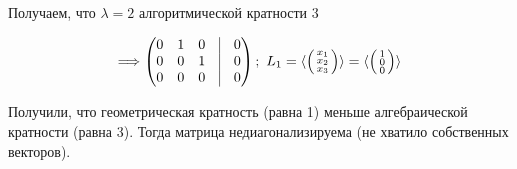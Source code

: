 Получаем, что $\lambda = 2$ алгоритмической кратности 3

$$\Longrightarrow
\begin{pmatrix}
0 & 1 & 0 & \vrule & 0\\
0 & 0 & 1 & \vrule & 0\\
0 & 0 & 0 & \vrule & 0\\
\end{pmatrix};
~L_1 = 
\langle
\left(
\begin{smallmatrix*}[c]
x_1\\ x_2\\ x_3\\ 
\end{smallmatrix*}
\right) 
\rangle=
\langle
\left(
\begin{smallmatrix*}[c]
1\\ 0\\ 0\\ 
\end{smallmatrix*}
\right) 
\rangle $$

Получили, что геометрическая кратность (равна 1) меньше алгебраической кратности (равна 3). Тогда матрица недиагонализируема (не хватило собственных векторов).    